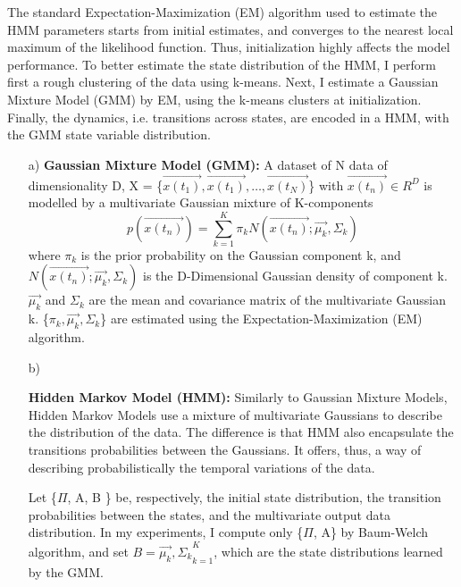\documentclass[conference]{IEEEtran}
\begin{document}
The standard Expectation-Maximization (EM) algorithm used to estimate the HMM parameters starts from initial estimates, and converges to the nearest local maximum of the likelihood function. Thus, initialization highly affects the model performance. To better estimate the state distribution of the HMM, I perform first a rough clustering of the data using k-means. Next, I estimate a Gaussian Mixture Model (GMM) by EM, using the k-means clusters at initialization. Finally, the dynamics, i.e. transitions across states, are encoded in a HMM, with the GMM state variable distribution.

\begin{itemize}
\item[a)]{
    \textbf{Gaussian Mixture Model (GMM):} A dataset of N data of dimensionality D, X = \{$\vec{x(t_{1})}, \vec{x(t_{1})},\dots,\vec{x(t_{N})}$\} with $\vec{x(t_{n})} \in R^{D}$ is modelled by a multivariate Gaussian mixture of K-components
    \begin{equation}
        p(\vec{x(t_{n})}) = \sum_{k=1}^K \pi_{k} N (\vec{x(t_{n})}; \vec{\mu_{k}}, \Sigma_{k})
    \end{equation}
    where $\pi_{k}$ is the prior probability on the Gaussian component k, and $N (\vec{x(t_{n})}; \vec{\mu_{k}}, \Sigma_{k})$ is the D-Dimensional Gaussian density of component k. $\vec{\mu_{k}}$ and $\Sigma_{k}$ are the mean and covariance matrix of the multivariate Gaussian k. \{$\pi_{k}, \vec{\mu_{k}} , \Sigma_{k}$\} are estimated using the Expectation-Maximization (EM) algorithm.
}    
\\
\item[b)]{
    \textbf{Hidden Markov Model (HMM):} Similarly to Gaussian Mixture Models, Hidden Markov Models use a mixture of multivariate Gaussians to describe the distribution of the data.  The difference is that HMM also encapsulate the transitions probabilities between the Gaussians. It offers, thus, a way of describing probabilistically the temporal variations of the data.

    Let \{$\Pi$, A, B \} be, respectively, the initial state distribution, the transition probabilities between the states, and the multivariate output data distribution. In my experiments, I compute only \{$\Pi$, A\} by Baum-Welch algorithm, and set $B = {\vec{\mu_{k}}, \Sigma_{k}}_{k=1}^{K}$, which are the state distributions learned by the GMM. 
    
}
\end{itemize}
\end{document}
